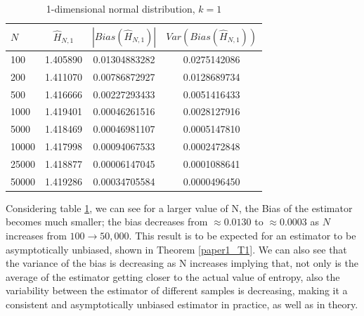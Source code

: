 \documentclass{report}
\begin{document}
\begin{table}
\caption{1-dimensional normal distribution, $k=1$} \label{normal_k=1_table}
\begin{center}
\begin{tabular}{| l | c c c|} 
\toprule
$N$ & $\hat{H}_{N, 1}$ & $|Bias(\hat{H}_{N, 1})|$ & $Var(Bias(\hat{H}_{N, 1}))$ \\
\midrule[1pt]
100     & 1.405890     & 0.01304883282     & 0.0275142086  \\
200     & 1.411070     & 0.00786872927     & 0.0128689734  \\
500     & 1.416666     & 0.00227293433     & 0.0051416433  \\
1000    & 1.419401     & 0.00046261516     & 0.0028127916  \\
5000    & 1.418469     & 0.00046981107     & 0.0005147810  \\
10000   & 1.417998     & 0.00094067533     & 0.0002472848  \\
25000   & 1.418877     & 0.00006147045     & 0.0001088641  \\
50000   & 1.419286     & 0.00034705584     & 0.0000496450  \\
\hline
\end{tabular}
\end{center}
\end{table}

Considering table \ref{normal_k=1_table}, we can see for a larger value of N, the Bias of the estimator becomes much smaller; the bias decreases from $\approx 0.0130$ to $\approx 0.0003$ as $N$ increases from $100 \to 50,000$. This result is to be expected for an estimator to be asymptotically unbiased, shown in Theorem \ref{paper1_T1}. We can also see that the variance of the bias is decreasing as N increases implying that, not only is the average of the estimator getting closer to the actual value of entropy, also the variability between the estimator of different samples is decreasing, making it a consistent and asymptotically unbiased estimator in practice, as well as in theory.
\end{document}

